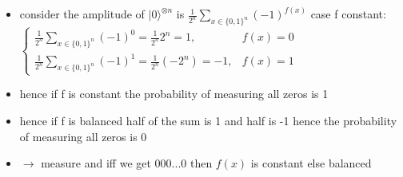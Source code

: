\documentclass[12pt,a4paper]{article}
\newcommand{\ecb}[1]{\{#1\}}
\newcommand{\ket}[1]{\vert #1 \rangle}
\begin{document}
\begin{itemize}
\begin{itemize}
\item consider the amplitude of $\ket{0}^{\otimes n}$ is $\displaystyle \frac{1}{2^n} \sum_{x\in\ecb{0,1}^n} (-1)^{f(x)}$
case f constant: $\displaystyle \begin{cases} \frac{1}{2^n} \sum_{x\in\ecb{0,1}^n} (-1)^0 = \frac{1}{2^n} 2^n = 1, & f(x) = 0\\\frac{1}{2^n} \sum_{x\in\ecb{0,1}^n} (-1)^1 = \frac{1}{2^n} (-2^n) = -1, & f(x)=1 \end{cases}$
\item hence if f is constant the probability of measuring all zeros is 1
\item hence if f is balanced half of the sum is 1 and half is -1 hence the probability of measuring all zeros is 0
\item $\rightarrow$ measure and iff we get 000...0 then $f(x)$ is constant else balanced
\end{itemize}
\end{itemize}
\end{document}
